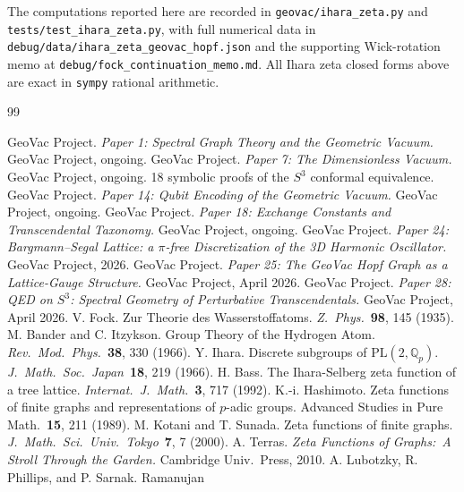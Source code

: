 \documentclass[11pt]{article}
\begin{document}
The computations reported here are recorded in
\texttt{geovac/ihara\_zeta.py} and \texttt{tests/test\_ihara\_zeta.py},
with full numerical data in
\texttt{debug/data/ihara\_zeta\_geovac\_hopf.json} and the
supporting Wick-rotation memo at
\texttt{debug/fock\_continuation\_memo.md}.  All Ihara zeta closed
forms above are exact in \texttt{sympy} rational arithmetic.

\begin{thebibliography}{99}

 GeoVac Project.  \emph{Paper 1: Spectral Graph Theory
and the Geometric Vacuum.}  GeoVac Project, ongoing.
 GeoVac Project.  \emph{Paper 7: The Dimensionless
Vacuum.}  GeoVac Project, ongoing.  18 symbolic proofs of the
$S^3$ conformal equivalence.
 GeoVac Project.  \emph{Paper 14: Qubit Encoding of
the Geometric Vacuum.}  GeoVac Project, ongoing.
 GeoVac Project.  \emph{Paper 18: Exchange Constants
and Transcendental Taxonomy.}  GeoVac Project, ongoing.
 GeoVac Project.  \emph{Paper 24: Bargmann--Segal
Lattice: a $\pi$-free Discretization of the 3D Harmonic Oscillator.}
GeoVac Project, 2026.
 GeoVac Project.  \emph{Paper 25: The GeoVac Hopf
Graph as a Lattice-Gauge Structure.}  GeoVac Project, April 2026.
 GeoVac Project.  \emph{Paper 28: QED on $S^3$:
Spectral Geometry of Perturbative Transcendentals.}  GeoVac Project,
April 2026.
 V. Fock.  Zur Theorie des Wasserstoffatoms.
\emph{Z.\ Phys.}\ \textbf{98}, 145 (1935).
 M. Bander and C. Itzykson.  Group Theory of the
Hydrogen Atom.  \emph{Rev.\ Mod.\ Phys.}\ \textbf{38}, 330 (1966).
 Y. Ihara.  Discrete subgroups of $\mathrm{PL}(2,
\mathbb{Q}_p)$.  \emph{J.\ Math.\ Soc.\ Japan}\ \textbf{18}, 219 (1966).
 H. Bass.  The Ihara-Selberg zeta function of a
tree lattice.  \emph{Internat.\ J.\ Math.}\ \textbf{3}, 717 (1992).
 K.-i. Hashimoto.  Zeta functions of finite
graphs and representations of $p$-adic groups.  Advanced Studies in
Pure Math.\ \textbf{15}, 211 (1989).
 M. Kotani and T. Sunada.  Zeta functions of
finite graphs.  \emph{J.\ Math.\ Sci.\ Univ.\ Tokyo}\ \textbf{7}, 7
(2000).
 A. Terras.  \emph{Zeta Functions of Graphs:\
A Stroll Through the Garden.}  Cambridge Univ.\ Press, 2010.
 A. Lubotzky, R. Phillips, and P. Sarnak.  Ramanujan

\end{thebibliography}
\end{document}
